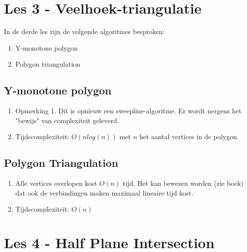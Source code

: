 \documentclass[12pt,a4paper]{article}
\begin{document}
	\section{Les 3 - Veelhoek-triangulatie}    
		In de derde les zijn de volgende algoritmes besproken:
		\begin{enumerate}
			\item Y-monotone polygon
			\item Polygon triangulation
		\end{enumerate}                
	
		\subsection{Y-monotone polygon}
			\begin{enumerate}
				\item Opmerking 1. Dit is opnieuw een sweepline-algoritme. Er wordt nergens het "bewijs" van complexiteit geleverd.
				\item Tijdscomplexiteit: $O(n log (n))$ met $n$ het aantal vertices in de polygon. 
			\end{enumerate}
		
		\subsection{Polygon Triangulation}
			\begin{enumerate}
				\item Alle vertices overlopen kost $O(n)$ tijd. Het kan bewezen worden (zie boek) dat ook de verbindingen maken maximaal lineaire tijd kost.
				\item Tijdscomplexiteit: $O(n)$
			\end{enumerate}
		
	\section{Les 4 - Half Plane Intersection}
\end{document}
